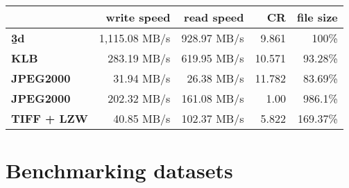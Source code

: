\begin{table}[tbp]
  \renewcommand{\arraystretch}{2}
  \setlength{\tabcolsep}{9pt}
  \centering
  \begin{tabular}{lrrrr}
      & \textbf{write speed} & \textbf{read speed} & \textbf{CR} & \textbf{file size} \\
      \hline
      \hline
      \textbf{\b3d} & 1,115.08 MB/s & 928.97 MB/s & 9.861 & 100\% \\ \hline
      \textbf{KLB} & 283.19 MB/s & 619.95 MB/s & 10.571 & 93.28\% \\ \hline
      \textbf{JPEG2000} & 31.94 MB/s & 26.38 MB/s & 11.782 & 83.69\% \\ \hline
      \textbf{JPEG2000} & 202.32 MB/s & 161.08 MB/s & 1.00 & 986.1\% \\ \hline
      \textbf{TIFF + LZW} & 40.85 MB/s & 102.37 MB/s & 5.822 & 169.37\%
  \end{tabular}
  \label{tab:performance}
\end{table}


\section*{Benchmarking datasets}

